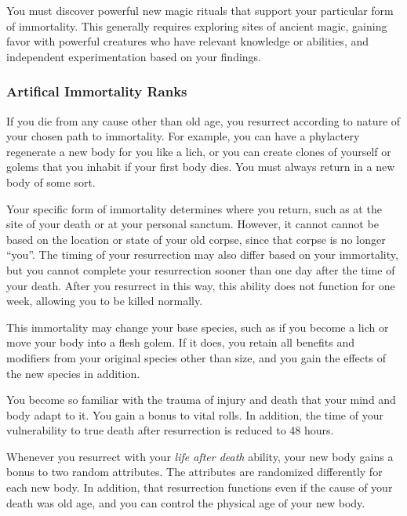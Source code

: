          You must discover powerful new magic rituals that support your particular form of immortality. This generally requires exploring sites of ancient magic, gaining favor with powerful creatures who have relevant knowledge or abilities, and independent experimentation based on your findings.

        \subsubsection{Artifical Immortality Ranks}

             If you die from any cause other than old age, you resurrect according to nature of your chosen path to immortality.
            For example, you can have a phylactery regenerate a new body for you like a lich, or you can create clones of yourself or golems that you inhabit if your first body dies.
            You must always return in a new body of some sort.

            Your specific form of immortality determines where you return, such as at the site of your death or at your personal sanctum.
            However, it cannot cannot be based on the location or state of your old corpse, since that corpse is no longer ``you''.
            The timing of your resurrection may also differ based on your immortality, but you cannot complete your resurrection sooner than one day after the time of your death. After you resurrect in this way, this ability does not function for one week, allowing you to be killed normally.

            This immortality may change your base species, such as if you become a lich or move your body into a flesh golem. If it does, you retain all benefits and modifiers from your original species other than size, and you gain the effects of the new species in addition.

             You become so familiar with the trauma of injury and death that your mind and body adapt to it.
            You gain a  bonus to vital rolls.
            In addition, the time of your vulnerability to true death after resurrection is reduced to 48 hours.

             Whenever you resurrect with your \textit{life after death} ability, your new body gains a  bonus to two random attributes. The attributes are randomized differently for each new body. In addition, that resurrection functions even if the cause of your death was old age, and you can control the physical age of your new body.

